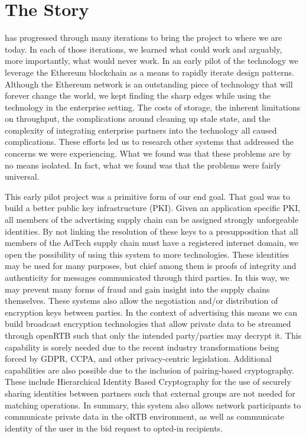 \section{The Story}

\LayerTwo{} has progressed through many iterations to bring the project
to where we are today.
In each of those iterations, we learned what could work and arguably,
more importantly, what would never work.
In an early pilot of the technology we leverage the Ethereum blockchain
as a means to rapidly iterate design patterns.
Although the Ethereum network is an outstanding piece of technology
that will forever change the world, we kept finding the sharp edges
while using the technology in the enterprise setting.
The costs of storage, the inherent limitations on throughput, the
complications around cleaning up stale state, and the complexity of
integrating enterprise partners into the technology all caused
complications.
These efforts led us to research other systems that addressed the
concerns we were experiencing.
What we found was that these problems are by no means isolated.
In fact, what we found was that the problems were fairly universal.

This early pilot project was a primitive form of our end goal.
That goal was to build a better public key infrastructure (PKI).
Given an application specific PKI, all members of the advertising
supply chain can be assigned strongly unforgeable identities.
By not linking the resolution of these keys to a presupposition that
all members of the AdTech supply chain must have a registered internet
domain, we open the possibility of using this system to more
technologies.
These identities may be used for many purposes, but chief among them is
proofs of integrity and authenticity for messages communicated through
third parties.
In this way, we may prevent many forms of fraud and gain insight into
the supply chains themselves.
These systems also allow the negotiation and/or distribution of
encryption keys between parties.
In the context of advertising this means we can build broadcast
encryption technologies that allow private data to be streamed through
openRTB such that only the intended party/parties may decrypt it.
This capability is sorely needed due to the recent industry
transformations being forced by GDPR, CCPA, and other privacy-centric
legislation.
Additional capabilities are also possible due to the inclusion of
pairing-based cryptography.
These include Hierarchical Identity Based Cryptography for the use of
securely sharing identities between partners such that external groups
are not needed for matching operations.
In summary, this system also allows network participants to communicate
private data in the oRTB environment, as well as communicate identity
of the user in the bid request to opted-in recipients.

